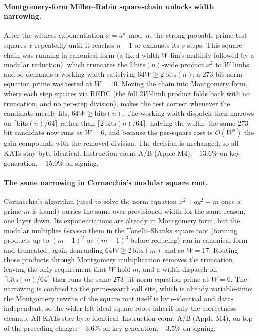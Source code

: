 \paragraph{Montgomery-form Miller--Rabin square-chain unlocks width
narrowing.}
After the witness exponentiation $x = a^d \bmod n$, the strong
probable-prime test squares $x$ repeatedly until it reaches $n-1$ or
exhausts its $s$ steps.  This square-chain was running in canonical
form (a fixed-width $W$-limb multiply followed by a modular
reduction), which truncates the $2\,\mathrm{bits}(n)$-wide product
$x^2$ to $W$ limbs and so demands a working width satisfying
$64W \geq 2\,\mathrm{bits}(n)$: a $273$-bit norm-equation prime was
tested at $W = 10$.  Moving the chain into Montgomery form, where
each step squares via REDC (the full $2W$-limb product folds back
with no truncation, and no per-step division), makes the test correct
whenever the candidate merely fits, $64W \geq \mathrm{bits}(n)$.  The
working-width dispatch then narrows on $\lceil \mathrm{bits}(n)/64
\rceil$ rather than $\lceil 2\,\mathrm{bits}(n)/64 \rceil$, halving
the width: the same $273$-bit candidate now runs at $W = 6$, and
because the per-square cost is $O(W^2)$ the gain compounds with the
removed division.  The decision is unchanged, so all KATs stay
byte-identical.  Instruction-count A/B (Apple M4): $-13.6\%$ on key
generation, $-15.0\%$ on signing.

\paragraph{The same narrowing in Cornacchia's modular square root.}
Cornacchia's algorithm (used to solve the norm equation
$x^2 + q y^2 = m$ once a prime $m$ is found) carries the same
over-provisioned width for the same reason, one layer down.  Its
exponentiations are already in Montgomery form, but the modular
multiplies \emph{between} them in the Tonelli--Shanks square root
(forming products up to $(m-1)^2$ or $(m-1)^3$ before reducing) ran in
canonical form and truncated, again demanding $64W \geq 2\,\mathrm{bits}
(m)$ and so $W = 17$.  Routing those products through Montgomery
multiplication removes the truncation, leaving the only requirement
that $W$ hold $m$, and a width dispatch on $\lceil \mathrm{bits}(m)/64
\rceil$ then runs the same $273$-bit norm-equation prime at $W = 6$.
The narrowing is confined to the prime-search call site, which is
already variable-time; the Montgomery rewrite of the square root itself
is byte-identical and data-independent, so the wider left-ideal square
roots inherit only the correctness cleanup.  All KATs stay
byte-identical.  Instruction-count A/B (Apple M4), on top of the
preceding change: $-3.6\%$ on key generation, $-3.5\%$ on signing.


